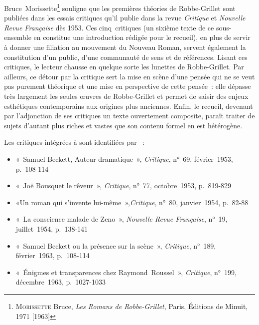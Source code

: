 \documentclass[12pt, a4paper]{article}
\begin{document}
Bruce~Morissette\footnote{\textsc{Morissette} Bruce, \textit{Les Romans de Robbe-Grillet}, Paris, Éditions de Minuit, 1971 [1963]} souligne que les premières théories de Robbe-Grillet sont publiées dans les essais critiques qu'il publie dans la revue \textit{Critique} et \textit{Nouvelle Revue Française} dès 1953. Ces cinq~critiques (un sixième texte de ce sous-ensemble en constitue une introduction rédigée pour le recueil), en plus de servir à donner une filiation au mouvement du Nouveau Roman, servent également la constitution d'un public, d'une communauté de sens et de références. Lisant ces critiques, le lecteur chausse en quelque sorte les lunettes de Robbe-Grillet. Par ailleurs, ce détour par la critique sert la mise en scène d'une pensée qui ne se veut pas purement théorique et une mise en perspective de cette pensée~: elle dépasse très largement les seules œuvres de Robbe-Grillet et permet de saisir des enjeux esthétiques contemporains aux origines plus anciennes. Enfin, le recueil, devenant par l'adjonction de ses critiques un texte ouvertement composite, paraît traiter de sujets d'autant plus riches et vastes que son contenu formel en est hétérogène.

Les critiques intégrées à \punr{} sont identifiées par \galia~:
\begin{itemize}
    \item «~Samuel Beckett, Auteur dramatique~», \textit{Critique}, n°~69, février~1953, p.~108-114
    \item «~Joë Bousquet le rêveur~», \textit{Critique}, n°~77, octobre~1953, p.~819-829
    \item «Un roman qui s'invente lui-même~»,\textit{Critique}, n°~80, janvier~1954, p.~82-88
    \item «~La conscience malade de Zeno~», \textit{Nouvelle Revue Française}, n°~19, juillet~1954, p.~138-141
    \item «~Samuel Beckett ou la présence sur la scène~», \textit{Critique}, n°~189, février~1963, p.~108-114
    \item «~Énigmes et transparences chez Raymond~Roussel~», \textit{Critique}, n°~199, décembre~1963, p.~1027-1033
\end{itemize}
\end{document}
